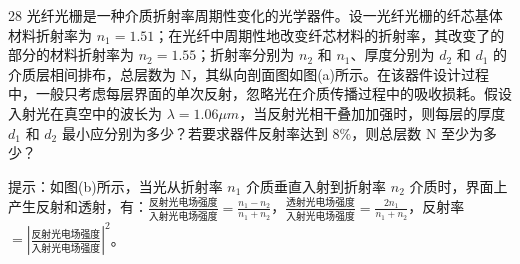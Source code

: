 \begin{problem}[理论考试][光纤光栅]{28}
  光纤光栅是一种介质折射率周期性变化的光学器件。设一光纤光栅的纤芯基体材料折射率为 $n_{1}=1.51$；在光纤中周期性地改变纤芯材料的折射率，其改变了的部分的材料折射率为 $n_{2}=1.55$；折射率分别为 $n_{2}$ 和 $n_{1}$、厚度分别为 $d_{2}$ 和 $d_{1}$ 的介质层相间排布，总层数为 N，其纵向剖面图如图(a)所示。在该器件设计过程中，一般只考虑每层界面的单次反射，忽略光在介质传播过程中的吸收损耗。假设入射光在真空中的波长为 $\lambda = 1.06\mu m$，当反射光相干叠加加强时，则每层的厚度 $d_{1}$ 和 $d_{2}$ 最小应分别为多少？若要求器件反射率达到 8\%，则总层数 N 至少为多少？

  提示：如图(b)所示，当光从折射率 $n_{1}$ 介质垂直入射到折射率 $n_{2}$ 介质时，界面上产生反射和透射，有：$\frac{\text{反射光电场强度}}{\text{入射光电场强度}} = \frac{n_1 - n_2}{n_1 + n_2}$，$\frac{\text{透射光电场强度}}{\text{入射光电场强度}} = \frac{2n_1}{n_1 + n_2}$，反射率 $= \left|\frac{\text{反射光电场强度}}{\text{入射光电场强度}}\right|^2$。
\end{problem}